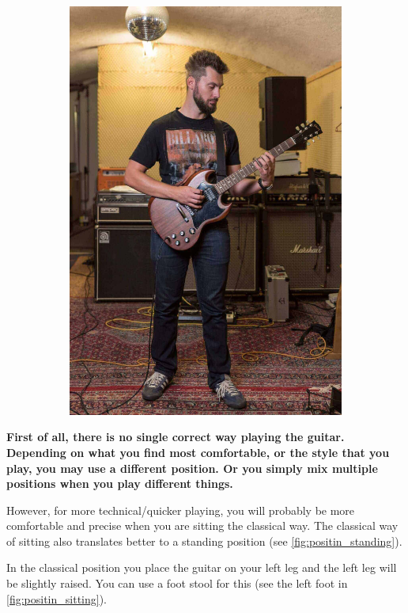 \begin{figure}[h]
\begin{subfigure}[b]{0.45\textwidth}
    \includegraphics[width=\textwidth]{../../Images/Letty_Guitar-Shooting_standing.jpg}
    \caption{}
    \label{fig:positin_standing}
  \end{subfigure}
  \caption{\cite{SitStandPosition}}
  \label{fig:positin}
\end{figure}


\textbf{First of all, there is no single correct way playing the guitar. Depending on what you find most comfortable, or the style that you play, you may use a different position. Or you simply mix multiple positions when you play different things.}

However, for more technical/quicker playing, you will probably be more comfortable and precise when you are sitting the classical way. The classical way of sitting also translates better to a standing position (see \autoref{fig:positin_standing}).

In the classical position you place the guitar on your left leg and the left leg will be slightly raised. You can use a foot stool for this (see the left foot in \autoref{fig:positin_sitting}).
